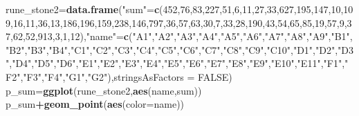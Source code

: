 \documentclass[]{article}
\newenvironment{Shaded}{\begin{snugshade}}{\end{snugshade}}
\newcommand{\DataTypeTok}[1]{\textcolor[rgb]{0.13,0.29,0.53}{#1}}
\newcommand{\DecValTok}[1]{\textcolor[rgb]{0.00,0.00,0.81}{#1}}
\newcommand{\KeywordTok}[1]{\textcolor[rgb]{0.13,0.29,0.53}{\textbf{#1}}}
\newcommand{\NormalTok}[1]{#1}
\newcommand{\OperatorTok}[1]{\textcolor[rgb]{0.81,0.36,0.00}{\textbf{#1}}}
\newcommand{\OtherTok}[1]{\textcolor[rgb]{0.56,0.35,0.01}{#1}}
\newcommand{\StringTok}[1]{\textcolor[rgb]{0.31,0.60,0.02}{#1}}
\begin{document}
\begin{Shaded}
\begin{Highlighting}[]
\NormalTok{rune_stone2=}\KeywordTok{data.frame}\NormalTok{(}\StringTok{"sum"}\NormalTok{=}\KeywordTok{c}\NormalTok{(}\DecValTok{452}\NormalTok{,}\DecValTok{76}\NormalTok{,}\DecValTok{83}\NormalTok{,}\DecValTok{227}\NormalTok{,}\DecValTok{51}\NormalTok{,}\DecValTok{6}\NormalTok{,}\DecValTok{11}\NormalTok{,}\DecValTok{27}\NormalTok{,}\DecValTok{33}\NormalTok{,}\DecValTok{627}\NormalTok{,}\DecValTok{195}\NormalTok{,}\DecValTok{147}\NormalTok{,}\DecValTok{10}\NormalTok{,}\DecValTok{109}\NormalTok{,}\DecValTok{16}\NormalTok{,}\DecValTok{11}\NormalTok{,}\DecValTok{36}\NormalTok{,}\DecValTok{13}\NormalTok{,}\DecValTok{186}\NormalTok{,}\DecValTok{196}\NormalTok{,}\DecValTok{159}\NormalTok{,}\DecValTok{238}\NormalTok{,}\DecValTok{146}\NormalTok{,}\DecValTok{797}\NormalTok{,}\DecValTok{36}\NormalTok{,}\DecValTok{57}\NormalTok{,}\DecValTok{63}\NormalTok{,}\DecValTok{30}\NormalTok{,}\DecValTok{7}\NormalTok{,}\DecValTok{33}\NormalTok{,}\DecValTok{28}\NormalTok{,}\DecValTok{190}\NormalTok{,}\DecValTok{43}\NormalTok{,}\DecValTok{54}\NormalTok{,}\DecValTok{65}\NormalTok{,}\DecValTok{85}\NormalTok{,}\DecValTok{19}\NormalTok{,}\DecValTok{57}\NormalTok{,}\DecValTok{9}\NormalTok{,}\DecValTok{37}\NormalTok{,}\DecValTok{62}\NormalTok{,}\DecValTok{52}\NormalTok{,}\DecValTok{913}\NormalTok{,}\DecValTok{3}\NormalTok{,}\DecValTok{1}\NormalTok{,}\DecValTok{12}\NormalTok{),}\StringTok{"name"}\NormalTok{=}\KeywordTok{c}\NormalTok{(}\StringTok{"A1"}\NormalTok{,}\StringTok{"A2"}\NormalTok{,}\StringTok{"A3"}\NormalTok{,}\StringTok{"A4"}\NormalTok{,}\StringTok{"A5"}\NormalTok{,}\StringTok{"A6"}\NormalTok{,}\StringTok{"A7"}\NormalTok{,}\StringTok{"A8"}\NormalTok{,}\StringTok{"A9"}\NormalTok{,}\StringTok{"B1"}\NormalTok{,}\StringTok{"B2"}\NormalTok{,}\StringTok{"B3"}\NormalTok{,}\StringTok{"B4"}\NormalTok{,}\StringTok{"C1"}\NormalTok{,}\StringTok{"C2"}\NormalTok{,}\StringTok{"C3"}\NormalTok{,}\StringTok{"C4"}\NormalTok{,}\StringTok{"C5"}\NormalTok{,}\StringTok{"C6"}\NormalTok{,}\StringTok{"C7"}\NormalTok{,}\StringTok{"C8"}\NormalTok{,}\StringTok{"C9"}\NormalTok{,}\StringTok{"C10"}\NormalTok{,}\StringTok{"D1"}\NormalTok{,}\StringTok{"D2"}\NormalTok{,}\StringTok{"D3"}\NormalTok{,}\StringTok{"D4"}\NormalTok{,}\StringTok{"D5"}\NormalTok{,}\StringTok{"D6"}\NormalTok{,}\StringTok{"E1"}\NormalTok{,}\StringTok{"E2"}\NormalTok{,}\StringTok{"E3"}\NormalTok{,}\StringTok{"E4"}\NormalTok{,}\StringTok{"E5"}\NormalTok{,}\StringTok{"E6"}\NormalTok{,}\StringTok{"E7"}\NormalTok{,}\StringTok{"E8"}\NormalTok{,}\StringTok{"E9"}\NormalTok{,}\StringTok{"E10"}\NormalTok{,}\StringTok{"E11"}\NormalTok{,}\StringTok{"F1"}\NormalTok{,}\StringTok{"F2"}\NormalTok{,}\StringTok{"F3"}\NormalTok{,}\StringTok{"F4"}\NormalTok{,}\StringTok{"G1"}\NormalTok{,}\StringTok{"G2"}\NormalTok{),}\DataTypeTok{stringsAsFactors =} \OtherTok{FALSE}\NormalTok{)}
\NormalTok{p_sum=}\KeywordTok{ggplot}\NormalTok{(rune_stone2,}\KeywordTok{aes}\NormalTok{(name,sum))}
\NormalTok{p_sum}\OperatorTok{+}\KeywordTok{geom_point}\NormalTok{(}\KeywordTok{aes}\NormalTok{(}\DataTypeTok{color=}\NormalTok{name))}
\end{Highlighting}
\end{Shaded}
\end{document}
